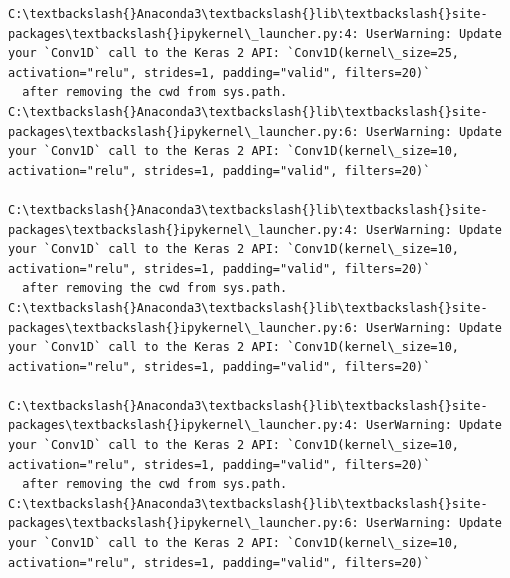 \documentclass[11pt]{article}
\begin{document}
    \begin{Verbatim}[commandchars=\\\{\}]
C:\textbackslash{}Anaconda3\textbackslash{}lib\textbackslash{}site-packages\textbackslash{}ipykernel\_launcher.py:4: UserWarning: Update your `Conv1D` call to the Keras 2 API: `Conv1D(kernel\_size=25, activation="relu", strides=1, padding="valid", filters=20)`
  after removing the cwd from sys.path.
C:\textbackslash{}Anaconda3\textbackslash{}lib\textbackslash{}site-packages\textbackslash{}ipykernel\_launcher.py:6: UserWarning: Update your `Conv1D` call to the Keras 2 API: `Conv1D(kernel\_size=10, activation="relu", strides=1, padding="valid", filters=20)`
  
C:\textbackslash{}Anaconda3\textbackslash{}lib\textbackslash{}site-packages\textbackslash{}ipykernel\_launcher.py:4: UserWarning: Update your `Conv1D` call to the Keras 2 API: `Conv1D(kernel\_size=10, activation="relu", strides=1, padding="valid", filters=20)`
  after removing the cwd from sys.path.
C:\textbackslash{}Anaconda3\textbackslash{}lib\textbackslash{}site-packages\textbackslash{}ipykernel\_launcher.py:6: UserWarning: Update your `Conv1D` call to the Keras 2 API: `Conv1D(kernel\_size=10, activation="relu", strides=1, padding="valid", filters=20)`
  
C:\textbackslash{}Anaconda3\textbackslash{}lib\textbackslash{}site-packages\textbackslash{}ipykernel\_launcher.py:4: UserWarning: Update your `Conv1D` call to the Keras 2 API: `Conv1D(kernel\_size=10, activation="relu", strides=1, padding="valid", filters=20)`
  after removing the cwd from sys.path.
C:\textbackslash{}Anaconda3\textbackslash{}lib\textbackslash{}site-packages\textbackslash{}ipykernel\_launcher.py:6: UserWarning: Update your `Conv1D` call to the Keras 2 API: `Conv1D(kernel\_size=10, activation="relu", strides=1, padding="valid", filters=20)`
  

    \end{Verbatim}
\end{document}
